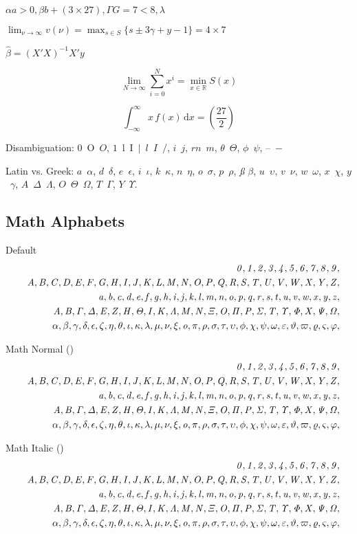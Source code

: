 \documentclass[12pt, a4paper, oneside]{article}
\newcommand{\mathup}[1]{\mathrm{#1}}
\theoremstyle{Plain}
\theoremstyle{Definition}
\theoremstyle{Remark}
\begin{document}
\begin{appendix}
\noindent%
{\sffamily\bfseries%
$\alpha a > 0, \beta b + (3 \times 27), \Gamma G = 7 < 8, \lambda$

$\lim_{\nu \to \infty} v(\nu) = \max_{s \in S} \{s \pm 3 \gamma + y - 1\} = 4 \times 7$

$\hat{\beta} = (X'X)^{-1}X'y$

$$\lim_{N \to \infty} \sum_{i=0}^{N} x^i = \min_{x \in \mathbb{R}} S(x)$$

$$\int_{-\infty}^{\infty} x\,f(x)\,\mathup{d}x = \left( \frac{27}{2} \right)$$

Disambiguation: $0$~O~$O$, $1$~l~I~$|$~$l$~$I$~$/$, $i$~$j$, $rn$~$m$, $\theta$~$\Theta$, $\phi$~$\psi$, --~$-$

Latin vs. Greek: $a$~$\alpha$, $d$~$\delta$, $e$~$\epsilon$, $i$~$\iota$, $k$~$\kappa$, $n$~$\eta$, $o$~$\sigma$, $p$~$\rho$, \textit{\ss} $\beta$, $u$~$\upsilon$, $v$~$\nu$, $w$~$\omega$, $x$~$\chi$, $y$~$\gamma$, $A$~$\Delta$~$\Lambda$, $O$~$\Theta$~$\Omega$, $T$~$\Gamma$, $Y$~$\Upsilon$.
}


\subsection{Math Alphabets \showfamily}
\label{app:math-test:alphabets}


Default
\def\test#1{#1,}
\begin{eqnarray*}
  && {\testnums}\\
  && {\testupper}\\
  && {\testlower}\\
  && {\testupgreek}\\
  && {\testlowgreek}
\end{eqnarray*}%

Math Normal (\texttt{\string\mathnormal})
\def\test#1{\mathnormal{#1},}
\begin{eqnarray*}
  && {\testnums}\\
  && {\testupper}\\
  && {\testlower}\\
  && {\testupgreek}\\
  && {\testlowgreek}
\end{eqnarray*}%

Math Italic (\texttt{\string\mathit})
\def\test#1{\mathit{#1},}
\begin{eqnarray*}
  && {\testnums}\\
  && {\testupper}\\
  && {\testlower}\\
  && {\testupgreek}\\
  && {\testlowgreek}
\end{eqnarray*}%


\end{appendix}
\end{document}
